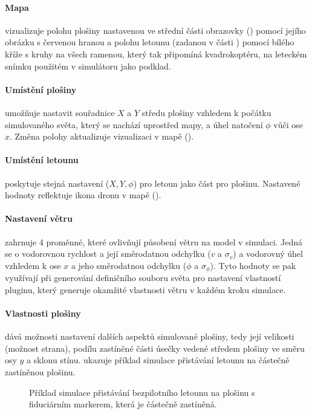     \paragraph{ Mapa}vizualizuje polohu plošiny nastavenou ve střední části obrazovky () pomocí jejího obrázku s červenou hranou a polohu letounu (zadanou v části ) pomocí bílého kříže s kruhy na všech ramenou, který tak připomíná kvadrokoptéru, na leteckém snímku použitém v simulátoru jako podklad.

    \paragraph{ Umístění plošiny} umožňuje nastavit souřadnice $X$ a $Y$ středu plošiny vzhledem k počátku simulovaného světa, který se nachází uprostřed mapy, a úhel natočení $\phi$ vůči ose $x$. Změna polohy aktualizuje vizualizaci v mapě ().

    \paragraph{ Umístění letounu} poskytuje stejná nastavení ($X, Y, \phi$) pro letoun jako část  pro plošinu. Nastavené hodnoty reflektuje ikona dronu v mapě ().

    \paragraph{ Nastavení větru} zahrnuje 4 proměnné, které ovlivňují působení větru na model v simulaci. Jedná se o vodorovnou rychlost a její směrodatnou odchylku ($v$ a $\sigma_v$) a vodorovný úhel vzhledem k ose $x$ a jeho směrodatnou odchylku ($\phi$ a $\sigma_\phi$). Tyto hodnoty se pak využívají při generování definičního souboru světa pro nastavení vlastností pluginu, který generuje okamžité vlastnosti větru v každém kroku simulace.

    \paragraph{ Vlastnosti plošiny} dává možnosti nastavení dalších aspektů simulované plošiny, tedy její velikosti (možnost strana), podílu zastíněné části úsečky vedené středem plošiny ve směru osy $y$ a sklonu stínu.  ukazuje příklad simulace přistávání letounu na částečně zastíněnou plošinu.
    \begin{figure}
        \centering
        \caption[Přistávání na zastíněnou plošinu]{Příklad simulace přistávání bezpilotního letounu na plošinu s fiduciárním markerem, která je částečně zastíněná.}
        \label{fig:stin}
    \end{figure}

